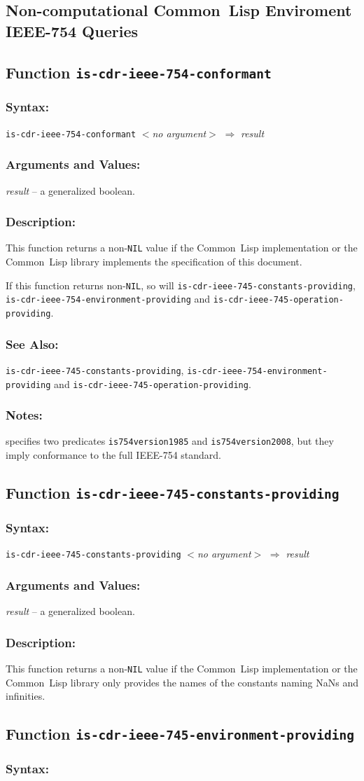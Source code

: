 \documentclass[10pt,fleqn]{article}
\newcommand{\CL}{\textsf{Common~Lisp}}
\newcommand{\code}[1]{\texttt{#1}}
\newcommand{\varname}[1]{\textit{#1}}
\newcommand{\IEEEFPStd}{IEEE-754}
\newcommand{\DDictionaryItem}[1]{\vspace*{6pt}\noindent\hrulefill\vspace*{-9pt}\subsection*{#1}}
\newcommand{\DSyntax}{\subsubsection*{Syntax:}}
\newcommand{\DArgsNValues}{\subsubsection*{Arguments and Values:}}
\newcommand{\DDescription}{\subsubsection*{Description:}}
\newcommand{\DNotes}{\subsubsection*{Notes:}}
\newcommand{\DSeeAlso}{\subsubsection*{See Also:}}
\begin{document}
\subsection{Non-computational \CL{} Enviroment \IEEEFPStd{} Queries}

\DDictionaryItem{Function \code{is-cdr-ieee-754-conformant}}

\DSyntax{}

\code{is-cdr-ieee-754-conformant} \varname{$<$no argument$>$}
$\Rightarrow$ \varname{result}

\DArgsNValues{}

\varname{result} -- a generalized boolean.

\DDescription{}

This function returns a non-\code{NIL} value if the \CL{}
implementation or the \CL{} library implements the specification of
this document.

If this function returns non-\code{NIL}, so will
\code{is-cdr-ieee-745-constants-providing},
\code{is-cdr-ieee-754-environment-providing} and
\code{is-cdr-ieee-745-operation-providing}.

\DSeeAlso{}

\code{is-cdr-ieee-745-constants-providing},
\code{is-cdr-ieee-754-environment-providing} and
\code{is-cdr-ieee-745-operation-providing}.



\DNotes{}

\cite{2008:IEEE-754} specifies two predicates \code{is754version1985} and
\code{is754version2008}, but they imply conformance to the full
\IEEEFPStd{} standard.



\DDictionaryItem{Function \code{is-cdr-ieee-745-constants-providing}}

\DSyntax{}

\code{is-cdr-ieee-745-constants-providing} \varname{$<$no argument$>$}
$\Rightarrow$ \varname{result}

\DArgsNValues{}

\varname{result} -- a generalized boolean.

\DDescription{}

This function returns a non-\code{NIL} value if the \CL{}
implementation or the \CL{} library only provides the names of the
constants naming NaNs and infinities.


\DDictionaryItem{Function \code{is-cdr-ieee-745-environment-providing}}

\DSyntax{}
\end{document}
